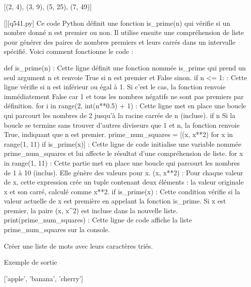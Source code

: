 [(2, 4), (3, 9), (5, 25), (7, 49)]
        \par
        \begin{solution}
            \renewcommand{\nomfichier}{q541.py}
            \pythonfile{\chemincode \nomfichier}[][\nomfichier]
            Ce code Python définit une fonction is_prime(n) qui vérifie si un nombre donné n est premier ou non. Il utilise ensuite une compréhension de liste pour générer des paires de nombres premiers et leurs carrés dans un intervalle spécifié. Voici comment fonctionne le code :

    def is_prime(n) : Cette ligne définit une fonction nommée is_prime qui prend un seul argument n et renvoie True si n est premier et False sinon.
        if n <= 1: : Cette ligne vérifie si n est inférieur ou égal à 1. Si c'est le cas, la fonction renvoie immédiatement False car 1 et tous les nombres négatifs ne sont pas premiers par définition.
        for i in range(2, int(n**0.5) + 1) : Cette ligne met en place une boucle qui parcourt les nombres de 2 jusqu'à la racine carrée de n (incluse).
        if n %
        Si la boucle se termine sans trouver d'autres diviseurs que 1 et n, la fonction renvoie True, indiquant que n est premier.
    prime_num_squares = [(x, x**2) for x in range(1, 11) if is_prime(x)] : Cette ligne de code initialise une variable nommée prime_num_squares et lui affecte le résultat d'une compréhension de liste.
        for x in range(1, 11) : Cette partie met en place une boucle qui parcourt les nombres de 1 à 10 (inclus). Elle génère des valeurs pour x.
        (x, x**2) : Pour chaque valeur de x, cette expression crée un tuple contenant deux éléments : la valeur originale x et son carré, calculé comme x**2.
        if is_prime(x) : Cette condition vérifie si la valeur actuelle de x est première en appelant la fonction is_prime. Si x est premier, la paire (x, x^2) est incluse dans la nouvelle liste.
    print(prime_num_squares) : Cette ligne de code affiche la liste prime_num_squares sur la console.
        \end{solution}
        

        \question
        Créer une liste de mots avec leurs caractères triés.

Exemple de sortie

['apple', 'banana', 'cherry']

